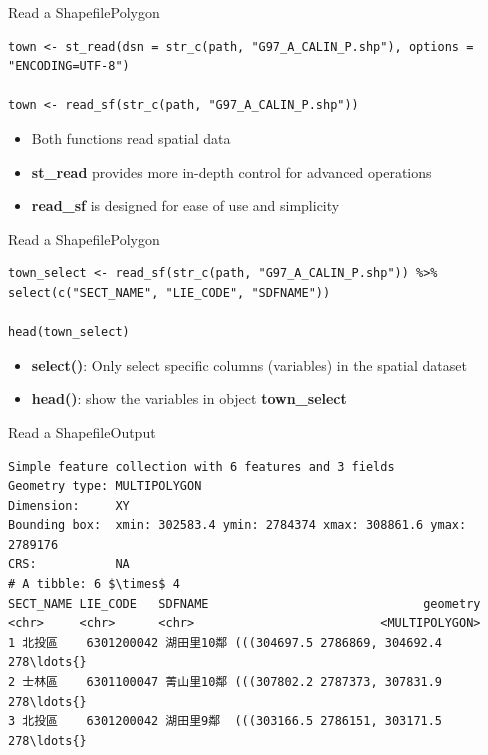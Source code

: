 \documentclass[dvipsnames,hyperref={pdfpagelabels=false}]{beamer}
\begin{document}
\begin{frame}[fragile]{Read a Shapefile}{Polygon}

\begin{lstlisting}
town <- st_read(dsn = str_c(path, "G97_A_CALIN_P.shp"), options = "ENCODING=UTF-8")

town <- read_sf(str_c(path, "G97_A_CALIN_P.shp"))
\end{lstlisting}
\begin{itemize}
\item Both functions read spatial data
\vspace{0.2cm}
\item \textbf{st\_read} provides more in-depth control for advanced operations
\vspace{0.2cm}
\item \textbf{read\_sf} is designed for ease of use and simplicity


\end{itemize}

\end{frame}



\begin{frame}[fragile]{Read a Shapefile}{Polygon}
	
\begin{lstlisting}
town_select <- read_sf(str_c(path, "G97_A_CALIN_P.shp")) %>%
select(c("SECT_NAME", "LIE_CODE", "SDFNAME"))

head(town_select) 
\end{lstlisting}
	\begin{itemize}
		\item \textbf{select()}: Only select specific columns (variables) in the spatial dataset
		\vspace{0.2cm}
		\item \textbf{head()}: show the variables in object \textbf{town\_select}
		
	\end{itemize}
	
\end{frame}



\begin{frame}[fragile]{Read a Shapefile}{Output}

\tiny

\begin{lstlisting}
Simple feature collection with 6 features and 3 fields
Geometry type: MULTIPOLYGON
Dimension:     XY
Bounding box:  xmin: 302583.4 ymin: 2784374 xmax: 308861.6 ymax: 2789176
CRS:           NA
# A tibble: 6 $\times$ 4
SECT_NAME LIE_CODE   SDFNAME                              geometry
<chr>     <chr>      <chr>                          <MULTIPOLYGON>
1 北投區    6301200042 湖田里10鄰 (((304697.5 2786869, 304692.4 278\ldots{}
2 士林區    6301100047 菁山里10鄰 (((307802.2 2787373, 307831.9 278\ldots{}
3 北投區    6301200042 湖田里9鄰  (((303166.5 2786151, 303171.5 278\ldots{}
\end{lstlisting}

\end{frame}
\end{document}
